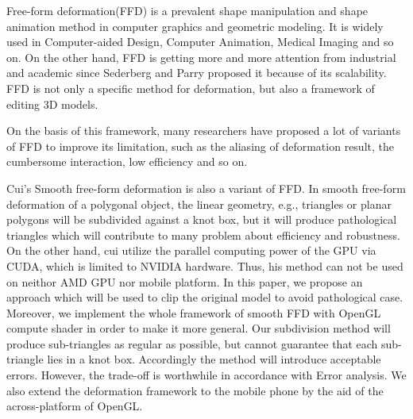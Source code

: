 

\begin{eabstract}
    Free-form deformation\cite{Sederberg86}(FFD) is a prevalent shape manipulation and shape animation method in computer graphics and geometric modeling. It is widely used in Computer-aided Design, Computer Animation, Medical Imaging and so on. On the other hand, FFD is getting more and more attention from industrial and academic since Sederberg and Parry proposed it because of its scalability. FFD is not only a specific method for deformation, but also a framework of editing 3D models.

    On the basis of this framework, many researchers have proposed a lot of variants of FFD to improve its limitation, such as the aliasing of deformation result, the cumbersome interaction, low efficiency and so on.

    Cui's Smooth free-form deformation\cite{Cui15} is also a variant of FFD. In smooth free-form deformation\cite{Cui15} of a polygonal object, the linear geometry, e.g., triangles or planar polygons will be subdivided against a knot box, but it will produce pathological triangles which will contribute to many problem about efficiency and robustness. On the other hand, cui utilize the parallel computing power of the GPU via CUDA, which is limited to NVIDIA hardware. Thus, his method can not be used on neithor AMD GPU nor mobile platform. In this paper, we propose an approach which will be used to clip the original model to avoid pathological case. Moreover, we implement the whole framework of smooth FFD with OpenGL compute shader in order to make it more general. Our subdivision method will produce sub-triangles as regular as possible, but cannot guarantee that each sub-triangle lies in a knot box. Accordingly the method will introduce acceptable errors. However, the trade-off is worthwhile in accordance with Error analysis. We also extend the deformation framework to the mobile phone by the aid of the across-platform of OpenGL.
\end{eabstract}

